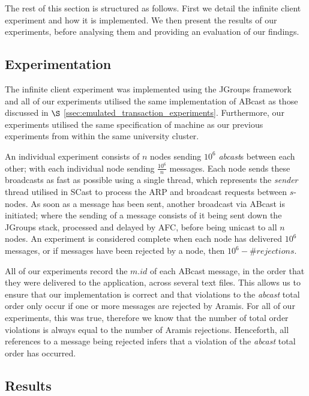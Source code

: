     The rest of this section is structured as follows.  First we detail the infinite client experiment and how it is implemented.  We then present the results of our experiments, before analysing them and providing an evaluation of our findings. 
    
    \subsection{Experimentation}
    The infinite client experiment was implemented using the JGroups framework and all of our experiments utilised the same implementation of \textsf{ABcast} as those discussed in $\S$ \ref{ssec:emulated_transaction_experiments}.  Furthermore, our experiments utilised the same specification of machine as our previous experiments from within the same university cluster.  
    
    An individual experiment consists of $n$ nodes sending $10^6$ \emph{abcast}s between each other; with each individual node sending $\frac{10^6}{n}$ messages.  Each node sends these broadcasts as fast as possible using a single thread, which represents the \emph{sender} thread utilised in \textsf{SCast} to process the ARP and broadcast requests between $s$-nodes.  As soon as a message has been sent, another broadcast via \textsf{ABcast} is initiated; where the sending of a message consists of it being sent down the JGroups stack, processed and delayed by AFC, before being unicast to all $n$ nodes.  An experiment is considered complete when each node has delivered $10^6$ messages, or if messages have been rejected by a node, then $10^6 - \#rejections$.  
    
    All of our experiments record the $m.id$ of each \textsf{ABcast} message, in the order that they were delivered to the application, across several text files.  This allows us to ensure that our implementation is correct and that violations to the \emph{abcast} total order only occur if one or more messages are rejected by \textsf{Aramis}.  For all of our experiments, this was true, therefore we know that the number of total order violations is always equal to the number of \textsf{Aramis} rejections.  Henceforth, all references to a message being rejected infers that a violation of the \emph{abcast} total order has occurred.  
    
    \subsection{Results}

